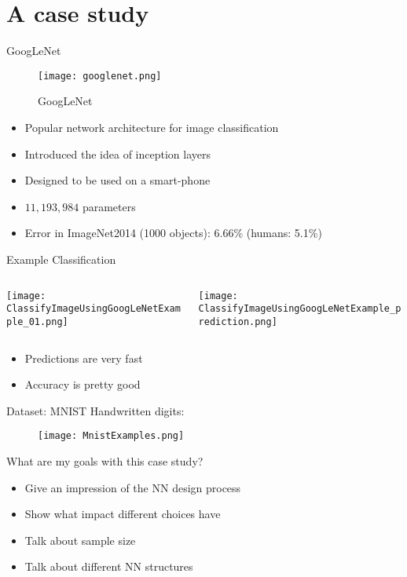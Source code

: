 \documentclass{beamer}
\begin{document}
\section{A case study}

\begin{frame}[t]{GoogLeNet}
  \begin{figure}[htpb]
    \centering
    \texttt{[image: googlenet.png]}
    \caption{GoogLeNet}
  \end{figure}
  \begin{itemize}
    \item Popular network architecture for image classification
    \item Introduced the idea of inception layers
    \item Designed to be used on a smart-phone
    \item $11,193,984$ parameters
    \item Error in ImageNet2014 (1000 objects): 6.66\% (humans: 5.1\%)
  \end{itemize}
\end{frame}

\begin{frame}[t]{Example Classification}
  \begin{columns}
    \begin{column}{0.6\textwidth}
    \texttt{[image: ClassifyImageUsingGoogLeNetExample\_01.png]}
    \end{column}
    \begin{column}{0.6\textwidth}
    \texttt{[image: ClassifyImageUsingGoogLeNetExample\_prediction.png]}
    \end{column}
  \end{columns}
  \begin{itemize}
    \item Predictions are very fast
    \item Accuracy is pretty good
  \end{itemize}
\end{frame}

\begin{frame}[t]{Dataset: MNIST}
  Handwritten digits:
  \begin{figure}[htpb]
    \centering
    \texttt{[image: MnistExamples.png]}
  \end{figure}
\end{frame}

\begin{frame}[t]{What are my goals with this case study?}
  \begin{itemize}
    \item Give an impression of the NN design process
    \item Show what impact different choices have
    \item Talk about sample size
    \item Talk about different NN structures
  \end{itemize}
\end{frame}
\end{document}
